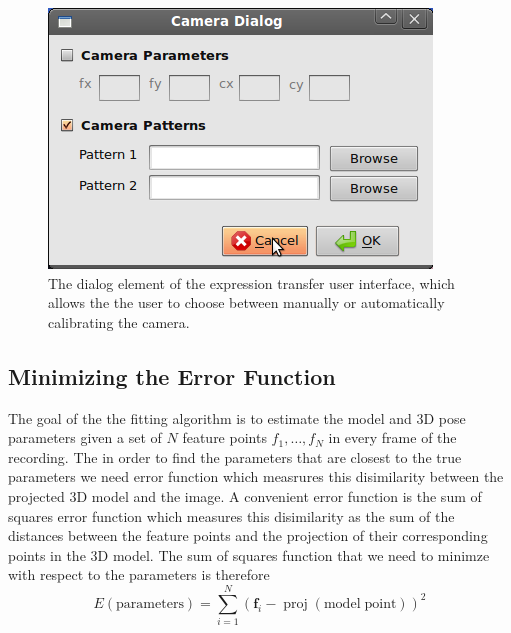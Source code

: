 \documentclass[11pt,a4paper]{report}
\begin{document}
\begin{figure}[H]
\begin{centering}
\includegraphics[scale=0.60]{images/cameraDialog.png}
\par\end{centering}

\caption{The dialog element of the expression transfer user interface, which
  allows the the user to choose between manually or automatically calibrating
  the camera.}
\label{fg:camdialog}

\end{figure}

\subsection{Minimizing the Error Function}\label{s:minerror}
The goal of the the fitting algorithm is to estimate the model and 3D pose
parameters given a set of $N$ feature points $f_1, \ldots , f_N$ in every frame of the recording. The in
order to find the parameters that are closest to the true parameters we need error
function which measrures this disimilarity between the projected 3D model and
the image. A convenient error function is the sum of squares error function
which measures this disimilarity as the
sum of the distances between the feature points and the
projection of their corresponding points in the 3D model. The sum of squares
function that we need to minimze with respect to the parameters is therefore
\begin{equation}\label{eq:fit0}
E(\mathrm{parameters}) = \sum_{i=1}^N (\mathbf{f}_i - \mathop{proj}(\mathrm{model\; point}))^2
\end{equation}
\end{document}
